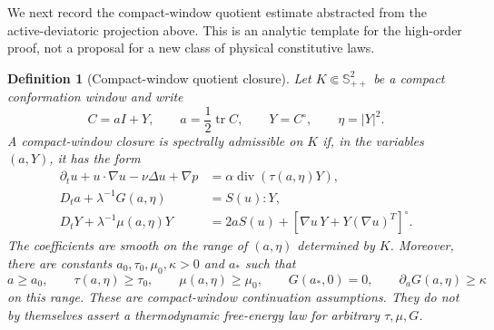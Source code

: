 \documentclass[11pt]{article}
\newtheorem{definition}{Definition}[section]
\newcommand{\Spp}{\mathbb S_{++}}
\newcommand{\tr}{\operatorname{tr}}
\newcommand{\divv}{\operatorname{div}}
\begin{document}
We next record the compact-window quotient estimate abstracted from the
active-deviatoric projection above.  This is an analytic template for the
high-order proof, not a proposal for a new class of physical constitutive laws.

\begin{definition}[Compact-window quotient closure]
\label{def:spectral-admissible}
Let \(K\Subset\Spp^2\) be a compact conformation window and write
\[
  C=aI+Y,\qquad a=\frac12\tr C,\qquad Y=C^\circ,\qquad \eta=|Y|^2 .
\]
A compact-window closure is spectrally admissible on \(K\) if, in the variables
\((a,Y)\), it has the form
\begin{align}
  \partial_tu+u\cdot\nabla u-\nu\Delta u+\nabla p
  &=\alpha\divv(\tau(a,\eta)Y),
  \label{eq:spectral-active-u}\\
  D_ta+\lambda^{-1}G(a,\eta)&=S(u):Y,
  \label{eq:spectral-active-a}\\
  D_tY+\lambda^{-1}\mu(a,\eta)Y
  &=2aS(u)+[\nabla u\,Y+Y(\nabla u)^T]^\circ .
  \label{eq:spectral-active-Y}
\end{align}
The coefficients are smooth on the range of \((a,\eta)\) determined by \(K\).
Moreover, there are constants \(a_0,\tau_0,\mu_0,\kappa>0\) and \(a_*\) such that
\[
  a\ge a_0,\qquad \tau(a,\eta)\ge\tau_0,\qquad
  \mu(a,\eta)\ge\mu_0,\qquad G(a_*,0)=0,
  \qquad \partial_aG(a,\eta)\ge\kappa
\]
on this range.  These are compact-window continuation assumptions.  They do
not by themselves assert a thermodynamic free-energy law for arbitrary
\(\tau,\mu,G\).
\end{definition}
\end{document}
